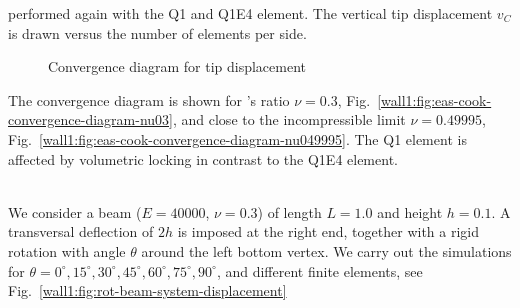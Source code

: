 performed again with the Q1 and Q1E4 
element. The vertical tip displacement $v_C$ is drawn versus the number of
elements per side.
\begin{figure}[H]
  \begin{center}
  \end{center}
  \caption{Convergence diagram for tip displacement}
  \label{wall1:fig:eas-cook-convergence-diagrams}
\end{figure}
The convergence diagram is shown for 's ratio $\nu=0.3$,
Fig.~\ref{wall1:fig:eas-cook-convergence-diagram-nu03}, and
close to the incompressible limit $\nu=0.49995$,
Fig.~\ref{wall1:fig:eas-cook-convergence-diagram-nu049995}. The Q1 element is
affected by volumetric locking in contrast to the Q1E4 element.

\\
We consider a beam ($E=40000$, $\nu=0.3$) of length $L=1.0$ and height
$h=0.1$. A transversal 
deflection of $2h$ is imposed at the right end, together with a rigid
rotation with angle $\theta$ around the left bottom vertex. We carry out the
simulations for $\theta=0^\circ, 15^\circ, 
30^\circ, 45^\circ, 60^\circ, 75^\circ, 90^\circ$, and different finite
elements, see Fig.~\ref{wall1:fig:rot-beam-system-displacement}

